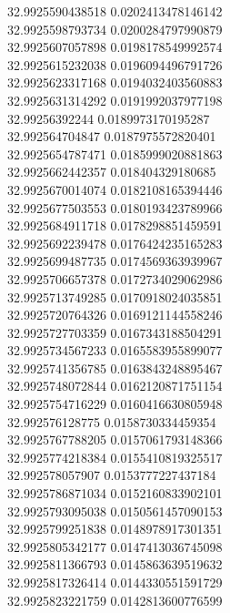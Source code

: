 {32.9925590438518	0.0202413478146142\\
32.9925598793734	0.0200284797990879\\
32.9925607057898	0.0198178549992574\\
32.9925615232038	0.0196094496791726\\
32.9925623317168	0.0194032403560883\\
32.9925631314292	0.0191992037977198\\
32.99256392244	0.0189973170195287\\
32.992564704847	0.0187975572820401\\
32.9925654787471	0.0185999020881863\\
32.9925662442357	0.018404329180685\\
32.9925670014074	0.0182108165394446\\
32.9925677503553	0.0180193423789966\\
32.9925684911718	0.0178298851459591\\
32.9925692239478	0.0176424235165283\\
32.9925699487735	0.0174569363939967\\
32.9925706657378	0.0172734029062986\\
32.9925713749285	0.0170918024035851\\
32.9925720764326	0.0169121144558246\\
32.9925727703359	0.0167343188504291\\
32.9925734567233	0.0165583955899077\\
32.9925741356785	0.0163843248895467\\
32.9925748072844	0.0162120871751154\\
32.9925754716229	0.0160416630805948\\
32.992576128775	0.0158730334459354\\
32.9925767788205	0.0157061793148366\\
32.9925774218384	0.0155410819325517\\
32.992578057907	0.0153777227437184\\
32.9925786871034	0.0152160833902101\\
32.9925793095038	0.0150561457090153\\
32.9925799251838	0.0148978917301351\\
32.9925805342177	0.0147413036745098\\
32.9925811366793	0.0145863639519632\\
32.9925817326414	0.0144330551591729\\
32.9925823221759	0.0142813600776599\\
}
